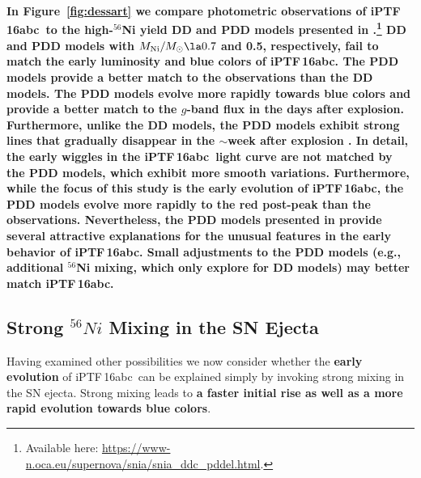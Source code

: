 \documentclass[twocolumn]{aastex61}
\newcommand{\abc}{iPTF\,16abc}
\begin{document}
\textbf{In Figure~\ref{fig:dessart} we compare photometric observations of
\abc\ to the high-$^{56}$Ni yield DD and PDD models presented in
\citet{2014MNRAS.441..532D}.\footnote{Available here:
\url{https://www-n.oca.eu/supernova/snia/snia_ddc_pddel.html}.} DD and PDD
models with $M_\mathrm{Ni}/M_\odot \la 0.7$ and 0.5, respectively, fail to
match the early luminosity and blue colors of \abc. The PDD models provide a
better match to the observations than the DD models. The PDD models evolve
more rapidly towards blue colors and provide a better match to the $g$-band
flux in the days after explosion. Furthermore, unlike the DD models, the PDD
models exhibit strong  lines that gradually disappear in the
$\sim$week after explosion \citep{2014MNRAS.441..532D}. In detail, the early
wiggles in the \abc\ light curve are not matched by the PDD models, which
exhibit more smooth variations. Furthermore, while the focus of this study is
the early evolution of \abc, the PDD models evolve more rapidly to the red
post-peak than the observations. Nevertheless, the PDD models presented in
\citet{2014MNRAS.441..532D} provide several attractive explanations for the
unusual features in the early behavior of \abc. Small adjustments to the PDD
models (e.g., additional $^{56}$Ni mixing, which
\citeauthor{2014MNRAS.441..532D} only explore for DD models) may better match
\abc.}

\subsection{Strong $^{56}Ni$ Mixing in the SN Ejecta}
\label{sec:Ni_mixing}

Having examined other possibilities we now consider whether the \textbf{early evolution} of \abc\ can be explained simply by invoking strong mixing in the 
SN ejecta. Strong mixing leads to \textbf{a faster initial rise as well as a more rapid evolution towards blue colors}.
\end{document}
